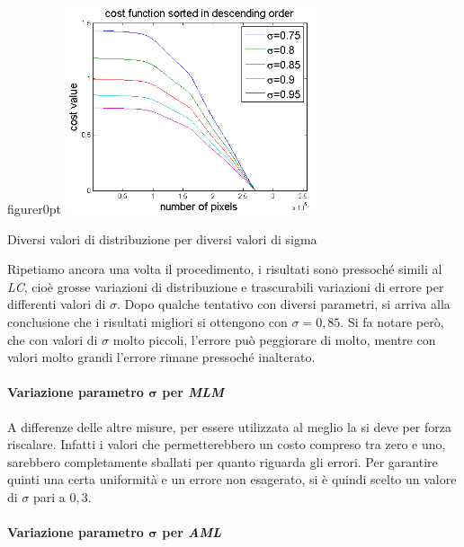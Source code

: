 \documentclass[12pt]{report}
\begin{document}
			\noindent
							
				\begin{wrapfloat}{figure}{r}{0pt}
					\includegraphics[width=0.55\textwidth]{./figures/sigma_NLM.png}
					\caption{Diversi valori di distribuzione per diversi valori di sigma}
					\label{fig:sigmaNLM}
				\end{wrapfloat} 
			
				\noindent Ripetiamo ancora una volta il procedimento, i risultati sono pressoché simili al \textit{LC}, cioè grosse variazioni di distribuzione e trascurabili variazioni di errore per differenti valori di $\sigma$. Dopo qualche tentativo con diversi parametri, si arriva alla conclusione che i risultati migliori si ottengono con $\sigma=0,85$. Si fa notare però, che con valori di $\sigma$ molto piccoli, l'errore può peggiorare di molto, mentre con valori molto grandi l'errore rimane pressoché inalterato.\newline \newline
				
			
			\paragraph{Variazione parametro $\bm{\sigma}$ per \textit{MLM}}	 	 	
			\label{par:sigmaMLM}
		 	 
		 	 	A differenze delle altre misure, per essere utilizzata al meglio la si deve per forza riscalare. Infatti i valori che permetterebbero un costo compreso tra zero e uno, sarebbero completamente sballati per quanto riguarda gli errori. Per garantire quinti una certa uniformità e un errore non esagerato, si è quindi scelto un valore di $\sigma$ pari a $0,3$. 
		 	 	
		 	 \paragraph{Variazione parametro $\bm{\sigma}$ per \textit{AML}}	 	 	
		 	 \label{par:sigmaAML}	
		 	 	
\end{document}
